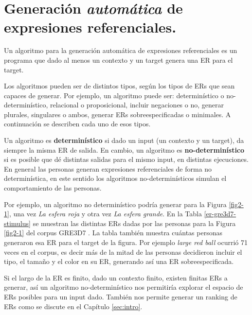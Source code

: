 \section{Generaci\'on \emph{autom\'atica} de expresiones referenciales.}
\label{sec:tipos_algoritmos}

Un algoritmo para la generaci\'on autom\'atica de expresiones referenciales es un programa que dado al menos un contexto y un target genera una ER para el target.

Los algoritmos pueden ser de distintos tipos, seg\'un los tipos de ERs que sean capaces de generar. Por ejemplo, un algoritmo puede ser: determin\'{i}stico o no-determin\'{i}stico, relacional o proposicional, incluir negaciones o no, generar plurales, singulares o ambos,
generar ERs sobreespecificadas o minimales. A continuaci\'on se describen cada uno de esos tipos.

Un algoritmo es {\bf determin\'{i}stico} si dado un input (un contexto y un target), da siempre la misma ER de salida. En cambio, un algoritmo es {\bf no-determin\'{i}stico} si es posible que d\'e distintas salidas para el mismo input, en distintas ejecuciones. En general las personas generan expresiones referenciales de forma no determin\'istica, en este sentido los algoritmos no-determin\'isticos simulan el comportamiento de las personas. 

Por ejemplo, un algoritmo no determin\'istico podr\'ia generar para la Figura \ref{fig2-1}, una vez {\it La esfera roja} y otra vez {\it La esfera grande}. En la Tabla \ref{er-gre3d7-stimulus} se muestran las distintas ERs dadas por las personas para la Figura \ref{fig2-1} del corpus GRE3D7 \cite{gre3d7}. La tabla tambi\'en muestra cu\'antas personas generaron esa ER para el target de la figura. Por ejemplo {\it large red ball} ocurri\'o 71 veces en el corpus, es decir m\'as de la mitad de las personas decidieron incluir el tipo, el tama\~no y el color en su ER, generando as\'i una ER sobreespecificada.

Si el largo de la ER es finito, dado un contexto finito, existen finitas ERs a generar, as\'i un algoritmo no-determin\'istico nos permitir\'ia explorar el espacio de ERs posibles para un input dado. Tambi\'en nos permite generar un ranking de ERs como se discute en el Cap\'itulo \ref{sec:intro}.

